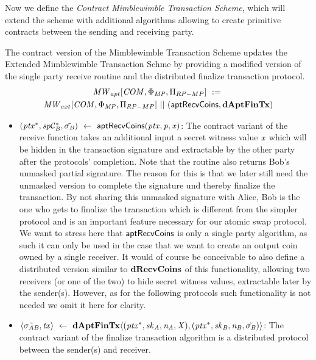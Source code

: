 Now we define the \emph{Contract Mimblewimble Transaction Scheme}, which will extend the scheme with additional algorithms allowing to create primitive contracts between the sending and receiving party.

\begin{definition}
    \label{def:atom:apt-ext-mw-tx-scheme}
    The contract version of the Mimblewimble Transaction Scheme updates the Extended Mimblewimble Transaction Schme by providing a modified version of the single party receive routine and the distributed finalize transaction protocol.
    \begin{gather*}
        \mathit{MW}_{apt}[\mathit{COM},\Phi_{\mathit{MP}},\Pi_{RP-MP}] ~:=~ \\ \mathit{MW}_{ext}[\mathit{COM},\Phi_{\mathit{MP}},\Pi_{RP-MP}] ~||~ (\mathsf{aptRecvCoins}, \mathbf{dAptFinTx})
    \end{gather*}
    \begin{itemize}
        \item $(\mathit{ptx}^*, \mathit{sp}\mathcal{C}_{\mathit{B}}^*, \tilde{\sigma_{\mathit{B}}}) ~\leftarrow~ \mathsf{aptRecvCoins}(\mathit{ptx},\mathit{p},\mathit{x})$: The contract variant of the receive function takes an additional input a secret witness value
        $\mathit{x}$ which will be hidden in the transaction signature and extractable by the other party after the protocols' completion.
        Note that the routine also returns Bob's unmasked partial signature.
        The reason for this is that we later still need the unmasked version to complete the signature und thereby finalize the transaction.
        By not sharing this unmasked signature with Alice, Bob is the one who gets to finalize the transaction which is different from the simpler protocol and is an important feature necessary for our atomic swap protocol.
        We want to stress here that $\mathsf{aptRecvCoins}$ is only a single party algorithm, as such it can only be used in the case that we want to create an output coin owned by a single receiver.
        It would of course be conceivable to also define a distributed version similar to $\mathbf{dRecvCoins}$ of this functionality, allowing two receivers (or one of the two) to hide secret witness values, extractable later by the sender(s).
        However, as for the following protocols such functionality is not needed we omit it here for clarity.
        \item $\langle \tilde{\sigma_{\mathit{A}\mathit{B}}}, \mathit{tx} \rangle ~\leftarrow~ \mathbf{dAptFinTx} \langle (\mathit{ptx}^*,\mathit{sk}_{\mathit{A}},\mathit{\mathit{n}_{\mathit{A}}},\mathit{X}), (\mathit{ptx}^*,\mathit{sk}_{\mathit{B}},\mathit{\mathit{n}_{\mathit{B}}},\tilde{\sigma_{\mathit{B}}}) \rangle$: The contract variant of the finalize transaction algorithm is a distributed protocol between the sender(s) and receiver.

\end{itemize}
\end{definition}
